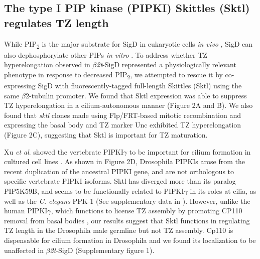 \documentclass[12pt, twoside, letterpaper]{article}
\newcommand{\PIP}{PIP\textsubscript{2}}
\newcommand{\sigd}{$\beta$\textit{2t}-SigD}
\begin{document}
\begin{doublespacing}
\begin{linenumbers}
    \subsection{The type I PIP kinase (PIPKI) Skittles (Sktl) regulates TZ length}
    While \PIP{} is the major substrate for SigD in eukaryotic cells \textit{in vivo}
    \citep{terebiznik2002elimination, zhou2001salmonella, sengupta2013depletion},
    SigD can also dephosphorylate other PIPs \textit{in vitro}
    \citep{norris1998sopb}.
    To address whether TZ hyperelongation observed in \sigd{} represented a
    physiologically relevant phenotype in response to decreased \PIP{},
    we attempted to rescue it by
    co-expressing SigD with
    fluorescently-tagged full-length Skittles (Sktl)
    using the same $\beta$2-tubulin promoter.
    We found that Sktl expression was able to suppress TZ hyperelongation
    in a cilium-autonomous manner (Figure 2A and B).
    We also found that \textit{sktl} clones made
    using Flp/FRT-based mitotic recombination and expressing the
    basal body and TZ marker Unc
    \citep{baker2004mechanosensory, wei2008depletion}
    exhibited TZ hyperelongation (Figure 2C),
    suggesting that Sktl is important for TZ maturation.

    Xu \textit{et al}. showed the vertebrate PIPKI$\gamma$ to be
    important for cilium formation in cultured cell lines
    \citep{xu2014pipkigamma}.
    As shown in Figure 2D, Drosophila PIPKIs arose from the recent duplication of
    the ancestral PIPKI gene,
    and are not orthologous to specific vertebrate PIPKI isoforms.
    Sktl has diverged more than its paralog PIP5K59B, and seems
    to be functionally related to PIPKI$\gamma$ in its roles at cilia,
    as well as the \textit{C. elegans} PPK-1 (See supplementary data in \citep{xu2014pipkigamma}).
    However, unlike the human PIPKI$\gamma$, which functions to license TZ assembly
    by promoting CP110 removal from basal bodies \citep{xu2016phosphatidylinositol},
    our results suggest that Sktl functions in
    regulating TZ length in the Drosophila male germline
    but not TZ assembly.
    Cp110 is dispensable for cilium formation in Drosophila \citep{franz2013cp110}
    and we found its localization to be unaffected in \sigd{} (Supplementary figure 1).
    

\end{linenumbers}
\end{doublespacing}
\end{document}
